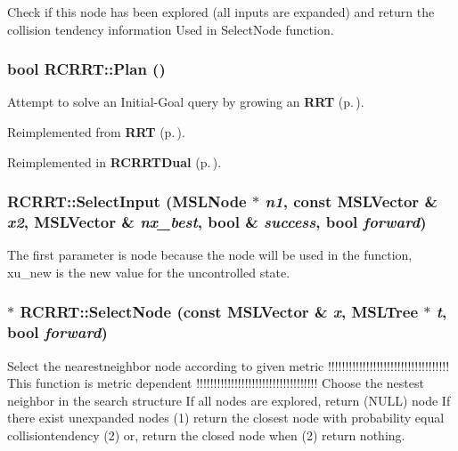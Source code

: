 Check if this node has been explored (all inputs are expanded) and return the collision tendency information Used in Select\-Node function.

\subsubsection{\setlength{\rightskip}{0pt plus 5cm}bool RCRRT::Plan ()\hspace{0.3cm}{\tt  [virtual]}}\label{classRCRRT_a10}


Attempt to solve an Initial-Goal query by growing an {\bf RRT} {\rm (p.\,\pageref{classRRT})}.



Reimplemented from {\bf RRT} {\rm (p.\,\pageref{classRRT_a3})}.

Reimplemented in {\bf RCRRTDual} {\rm (p.\,\pageref{classRCRRTDual_a2})}.
\subsubsection{ RCRRT::Select\-Input ({\bf MSLNode} $\ast$ {\em n1}, const {\bf MSLVector} \& {\em x2}, {\bf MSLVector} \& {\em nx\_\-best}, bool \& {\em success}, bool {\em forward})\hspace{0.3cm}{\tt  [virtual]}}\label{classRCRRT_a8}


The first parameter is node because the node will be used in the function, xu\_\-new is the new value for the uncontrolled state.

\subsubsection{ $\ast$ RCRRT::Select\-Node (const {\bf MSLVector} \& {\em x}, {\bf MSLTree} $\ast$ {\em t}, bool {\em forward})\hspace{0.3cm}{\tt  [virtual]}}\label{classRCRRT_a6}


Select the nearestneighbor node according to given metric !!!!!!!!!!!!!!!!!!!!!!!!!!!!!!!!!!! This function is metric dependent !!!!!!!!!!!!!!!!!!!!!!!!!!!!!!!!!!! Choose the nestest neighbor in the search structure If all nodes are explored, return (NULL) node If there exist unexpanded nodes (1) return the closest node with probability equal collisiontendency (2) or, return the closed node when (2) return nothing.



